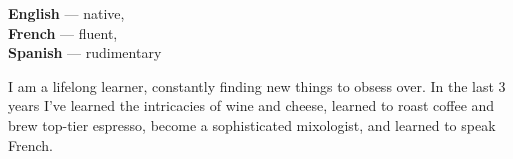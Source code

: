 \documentclass[9pt]{developercv} %
\begin{document}
%
\begin{minipage}[t]{0.2\textwidth}
    \vspace{-\baselineskip} %


        \textbf{English} — native,\\
        \textbf{French} — fluent,\\
        \textbf{Spanish} — rudimentary

\end{minipage}
\hfill
\begin{minipage}[t]{0.7\textwidth}
    \vspace{-\baselineskip} %


    I am a lifelong learner, constantly finding new things to obsess over. In
    the last 3 years I've learned the intricacies of wine and cheese, learned to
    roast coffee and brew top-tier espresso, become a sophisticated mixologist,
    and learned to speak French.
\end{minipage}
%
%

\end{document}
